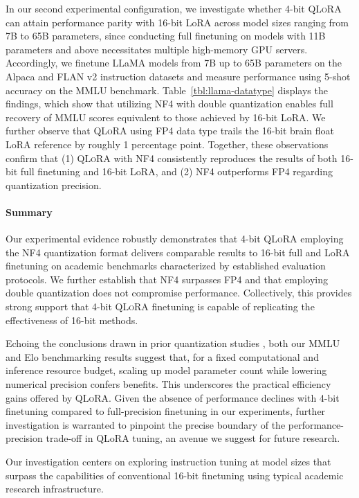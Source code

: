 In our second experimental configuration, we investigate whether 4-bit \textsc{QLoRA} can attain performance parity with 16-bit LoRA across model sizes ranging from 7B to 65B parameters, since conducting full finetuning on models with 11B parameters and above necessitates multiple high-memory GPU servers. Accordingly, we finetune LLaMA models from 7B up to 65B parameters on the Alpaca and FLAN v2 instruction datasets and measure performance using 5-shot accuracy on the MMLU benchmark. Table~\ref{tbl:llama-datatype} displays the findings, which show that utilizing NF4 with double quantization enables full recovery of MMLU scores equivalent to those achieved by 16-bit LoRA. We further observe that \textsc{QLoRA} using FP4 data type trails the 16-bit brain float LoRA reference by roughly 1 percentage point. Together, these observations confirm that (1) \textsc{QLoRA} with NF4 consistently reproduces the results of both 16-bit full finetuning and 16-bit LoRA, and (2) NF4 outperforms FP4 regarding quantization precision.

\paragraph{Summary} Our experimental evidence robustly demonstrates that 4-bit \textsc{QLoRA} employing the NF4 quantization format delivers comparable results to 16-bit full and LoRA finetuning on academic benchmarks characterized by established evaluation protocols. We further establish that NF4 surpasses FP4 and that employing double quantization does not compromise performance. Collectively, this provides strong support that 4-bit \textsc{QLoRA} finetuning is capable of replicating the effectiveness of 16-bit methods.

Echoing the conclusions drawn in prior quantization studies \citep{dettmers2022case}, both our MMLU and Elo benchmarking results suggest that, for a fixed computational and inference resource budget, scaling up model parameter count while lowering numerical precision confers benefits. This underscores the practical efficiency gains offered by \textsc{QLoRA}. Given the absence of performance declines with 4-bit finetuning compared to full-precision finetuning in our experiments, further investigation is warranted to pinpoint the precise boundary of the performance-precision trade-off in QLoRA tuning, an avenue we suggest for future research.

Our investigation centers on exploring instruction tuning at model sizes that surpass the capabilities of conventional 16-bit finetuning using typical academic research infrastructure.

